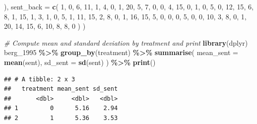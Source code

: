 \documentclass[
]{article}
\newenvironment{Shaded}{\begin{snugshade}}{\end{snugshade}}
\newcommand{\AttributeTok}[1]{\textcolor[rgb]{0.13,0.29,0.53}{#1}}
\newcommand{\CommentTok}[1]{\textcolor[rgb]{0.56,0.35,0.01}{\textit{#1}}}
\newcommand{\DecValTok}[1]{\textcolor[rgb]{0.00,0.00,0.81}{#1}}
\newcommand{\FunctionTok}[1]{\textcolor[rgb]{0.13,0.29,0.53}{\textbf{#1}}}
\newcommand{\NormalTok}[1]{#1}
\newcommand{\SpecialCharTok}[1]{\textcolor[rgb]{0.81,0.36,0.00}{\textbf{#1}}}
\begin{document}
\begin{Shaded}
\begin{Highlighting}[]
\NormalTok{  ),}
  \AttributeTok{sent\_back =} \FunctionTok{c}\NormalTok{(}
    \DecValTok{1}\NormalTok{, }\DecValTok{0}\NormalTok{, }\DecValTok{6}\NormalTok{, }\DecValTok{11}\NormalTok{, }\DecValTok{1}\NormalTok{, }\DecValTok{4}\NormalTok{, }\DecValTok{0}\NormalTok{, }\DecValTok{1}\NormalTok{, }\DecValTok{20}\NormalTok{, }\DecValTok{5}\NormalTok{, }\DecValTok{7}\NormalTok{, }\DecValTok{0}\NormalTok{, }\DecValTok{0}\NormalTok{, }\DecValTok{4}\NormalTok{, }\DecValTok{15}\NormalTok{, }\DecValTok{0}\NormalTok{, }\DecValTok{1}\NormalTok{, }\DecValTok{0}\NormalTok{, }\DecValTok{5}\NormalTok{, }\DecValTok{0}\NormalTok{, }\DecValTok{12}\NormalTok{, }\DecValTok{15}\NormalTok{, }\DecValTok{6}\NormalTok{, }\DecValTok{8}\NormalTok{, }\DecValTok{1}\NormalTok{, }\DecValTok{15}\NormalTok{, }\DecValTok{1}\NormalTok{, }\DecValTok{3}\NormalTok{, }\DecValTok{1}\NormalTok{, }\DecValTok{0}\NormalTok{, }\DecValTok{5}\NormalTok{, }\DecValTok{1}\NormalTok{,}
    \DecValTok{11}\NormalTok{, }\DecValTok{15}\NormalTok{, }\DecValTok{2}\NormalTok{, }\DecValTok{8}\NormalTok{, }\DecValTok{0}\NormalTok{, }\DecValTok{1}\NormalTok{, }\DecValTok{16}\NormalTok{, }\DecValTok{15}\NormalTok{, }\DecValTok{5}\NormalTok{, }\DecValTok{0}\NormalTok{, }\DecValTok{0}\NormalTok{, }\DecValTok{0}\NormalTok{, }\DecValTok{5}\NormalTok{, }\DecValTok{0}\NormalTok{, }\DecValTok{0}\NormalTok{, }\DecValTok{10}\NormalTok{, }\DecValTok{3}\NormalTok{, }\DecValTok{8}\NormalTok{, }\DecValTok{0}\NormalTok{, }\DecValTok{1}\NormalTok{, }\DecValTok{20}\NormalTok{, }\DecValTok{14}\NormalTok{, }\DecValTok{15}\NormalTok{, }\DecValTok{6}\NormalTok{, }\DecValTok{10}\NormalTok{, }\DecValTok{8}\NormalTok{, }\DecValTok{8}\NormalTok{, }\DecValTok{0}
\NormalTok{  )}
\NormalTok{)}

\CommentTok{\# Compute mean and standard deviation by treatment and print}
\FunctionTok{library}\NormalTok{(dplyr)}
\NormalTok{berg\_1995 }\SpecialCharTok{\%\textgreater{}\%}
  \FunctionTok{group\_by}\NormalTok{(treatment) }\SpecialCharTok{\%\textgreater{}\%}
  \FunctionTok{summarise}\NormalTok{(}
  \AttributeTok{mean\_sent =} \FunctionTok{mean}\NormalTok{(sent),}
  \AttributeTok{sd\_sent =} \FunctionTok{sd}\NormalTok{(sent)}
\NormalTok{  ) }\SpecialCharTok{\%\textgreater{}\%}
  \FunctionTok{print}\NormalTok{()}
\end{Highlighting}
\end{Shaded}

\begin{verbatim}
## # A tibble: 2 x 3
##   treatment mean_sent sd_sent
##       <dbl>     <dbl>   <dbl>
## 1         0      5.16    2.94
## 2         1      5.36    3.53
\end{verbatim}
\end{document}
